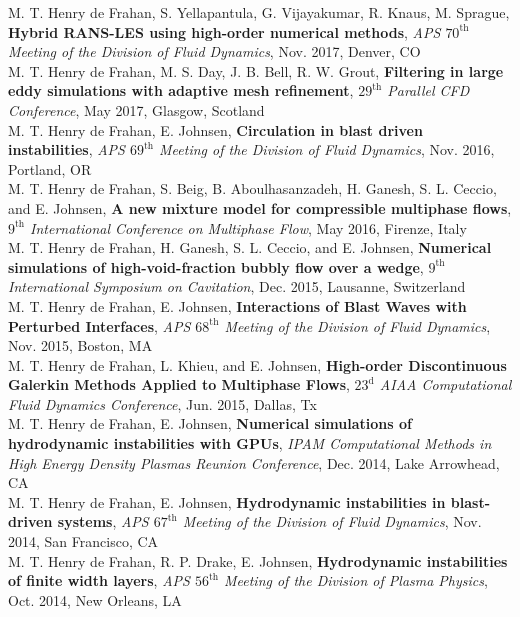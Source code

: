 \documentclass[11pt,letterpaper]{article}
\begin{document}
M. T. Henry de Frahan, S. Yellapantula, G. Vijayakumar, R. Knaus, M. Sprague, \textbf{Hybrid RANS-LES using high-order numerical methods}, \textit{APS $70^{\text{th}}$ Meeting of the Division of Fluid Dynamics}, Nov. 2017, Denver, CO\\[2ex]%
M. T. Henry de Frahan, M. S. Day, J. B. Bell, R. W. Grout, \textbf{Filtering in large eddy simulations with adaptive mesh refinement}, \textit{$29^{\text{th}}$ Parallel CFD Conference}, May 2017, Glasgow, Scotland\\[2ex]%
M. T. Henry de Frahan, E. Johnsen, \textbf{Circulation in blast driven instabilities}, \textit{APS $69^{\text{th}}$ Meeting of the Division of Fluid Dynamics}, Nov. 2016, Portland, OR\\[2ex]%
M. T. Henry de Frahan, S. Beig, B. Aboulhasanzadeh, H. Ganesh, S. L. Ceccio, and E. Johnsen, \textbf{A new mixture model for compressible multiphase flows}, \textit{$9^{\text{th}}$ International Conference on Multiphase Flow}, May 2016, Firenze, Italy\\[2ex]%
M. T. Henry de Frahan, H. Ganesh, S. L. Ceccio, and E. Johnsen, \textbf{Numerical simulations of high-void-fraction bubbly flow over a wedge}, \textit{$9^{\text{th}}$ International Symposium on Cavitation}, Dec. 2015, Lausanne, Switzerland\\[2ex]%
M. T. Henry de Frahan, E. Johnsen, \textbf{Interactions of Blast Waves with Perturbed Interfaces}, \textit{APS $68^{\text{th}}$ Meeting of the Division of Fluid Dynamics}, Nov. 2015, Boston, MA\\[2ex]%
M. T. Henry de Frahan, L. Khieu, and E. Johnsen, \textbf{High-order Discontinuous Galerkin Methods Applied to Multiphase Flows}, \textit{$23^{\text{d}}$ AIAA Computational Fluid Dynamics Conference}, Jun. 2015, Dallas, Tx\\[2ex]%
M. T. Henry de Frahan, E. Johnsen, \textbf{Numerical simulations of hydrodynamic instabilities with GPUs}, \textit{IPAM Computational Methods in High Energy Density Plasmas Reunion Conference}, Dec. 2014, Lake Arrowhead, CA\\[2ex]%
M. T. Henry de Frahan, E. Johnsen, \textbf{Hydrodynamic instabilities in blast-driven systems}, \textit{APS $67^{\text{th}}$ Meeting of the Division of Fluid Dynamics}, Nov. 2014, San Francisco, CA\\[2ex]%
M. T. Henry de Frahan, R. P. Drake, E. Johnsen, \textbf{Hydrodynamic instabilities of finite width layers}, \textit{APS ${56^{\text{th}}}$ Meeting of the Division of Plasma Physics}, Oct. 2014, New Orleans, LA\\[2ex]%
\end{document}
